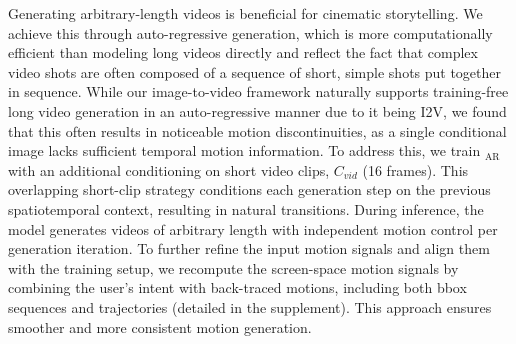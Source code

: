 Generating arbitrary-length videos is beneficial for cinematic storytelling. We achieve this through auto-regressive generation, which is more computationally efficient than modeling long videos directly and reflect the fact that complex video shots are often composed of a sequence of short, simple shots put together in sequence.
While our image-to-video framework naturally supports training-free long video generation in an auto-regressive manner due to it being I2V, we found that this often results in noticeable motion discontinuities, as a single conditional image lacks sufficient temporal motion information.
To address this, we train \MOCA$_\text{AR}$ with an additional conditioning on short video clips, $C_{vid}$ (16 frames). This overlapping short-clip strategy conditions each generation step on the previous spatiotemporal context, resulting in natural transitions. During inference, the model generates videos of arbitrary length with independent motion control per 
generation iteration. To further refine the input motion signals and align them with the training setup, we recompute the screen-space motion signals by combining the user’s intent with back-traced motions, including both bbox sequences and trajectories (detailed in the supplement). This approach ensures smoother and more consistent motion generation.